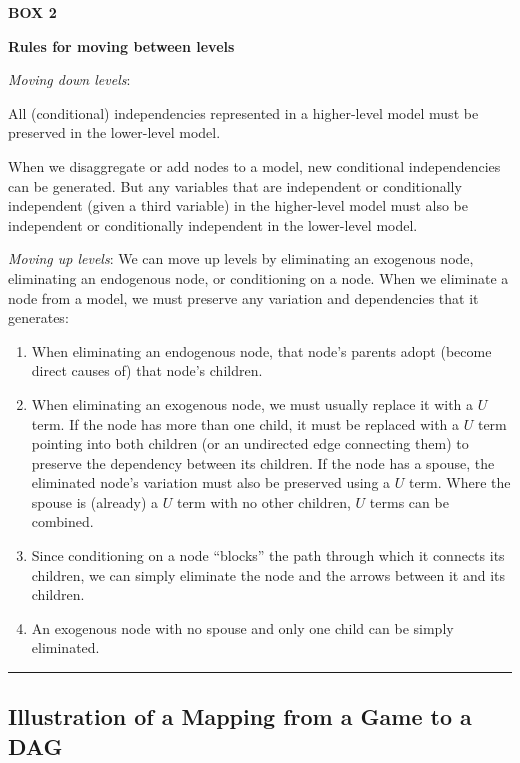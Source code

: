 \documentclass[12pt,]{book}
\providecommand{\tightlist}{%
  \setlength{\itemsep}{0pt}\setlength{\parskip}{0pt}}
\begin{document}
\textbf{BOX 2}

\textbf{Rules for moving between levels}

\emph{Moving down levels}:

All (conditional) independencies represented in a higher-level model must be preserved in the lower-level model.

When we disaggregate or add nodes to a model, new conditional independencies can be generated. But any variables that are independent or conditionally independent (given a third variable) in the higher-level model must also be independent or conditionally independent in the lower-level model.

\emph{Moving up levels}: We can move up levels by eliminating an exogenous node, eliminating an endogenous node, or conditioning on a node. When we eliminate a node from a model, we must preserve any variation and dependencies that it generates:

\begin{enumerate}
\def\labelenumi{\arabic{enumi}.}
\tightlist
\item
  When eliminating an endogenous node, that node's parents adopt (become direct causes of) that node's children.
\item
  When eliminating an exogenous node, we must usually replace it with a \(U\) term. If the node has more than one child, it must be replaced with a \(U\) term pointing into both children (or an undirected edge connecting them) to preserve the dependency between its children. If the node has a spouse, the eliminated node's variation must also be preserved using a \(U\) term. Where the spouse is (already) a \(U\) term with no other children, \(U\) terms can be combined.\\
\item
  Since conditioning on a node ``blocks'' the path through which it connects its children, we can simply eliminate the node and the arrows between it and its children.
\item
  An exogenous node with no spouse and only one child can be simply eliminated.
\end{enumerate}

\begin{center}\rule{0.5\linewidth}{\linethickness}\end{center}

\hypertarget{illustration-of-a-mapping-from-a-game-to-a-dag}{%
\subsection{Illustration of a Mapping from a Game to a DAG}\label{illustration-of-a-mapping-from-a-game-to-a-dag}}
\end{document}
